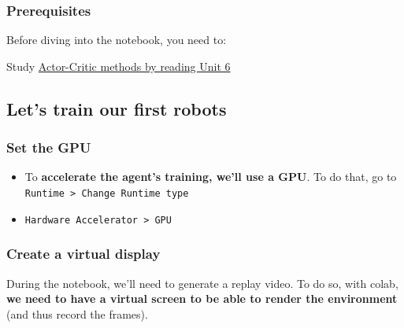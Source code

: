 \documentclass[11pt,a4paper]{article}
\begin{document}
\subsubsection{Prerequisites}\label{prerequisites}

Before diving into the notebook, you need to:

Study \href{https://huggingface.co/deep-rl-course/unit6/introduction}{Actor-Critic methods by reading Unit 6}

\subsection{Let's train our first robots}\label{lets-train-our-first-robots}

\subsubsection{Set the GPU}\label{set-the-gpu}

\begin{itemize}
\tightlist
\item
  To \textbf{accelerate the agent's training, we'll use a GPU}. To do that, go to \texttt{Runtime\ \textgreater{}\ Change\ Runtime\ type}
\end{itemize}


\begin{itemize}
\tightlist
\item
  \texttt{Hardware\ Accelerator\ \textgreater{}\ GPU}
\end{itemize}


\subsubsection{Create a virtual display}\label{create-a-virtual-display}

During the notebook, we'll need to generate a replay video. To do so, with colab, \textbf{we need to have a virtual screen to be able to render the environment} (and thus record the frames).
\end{document}
